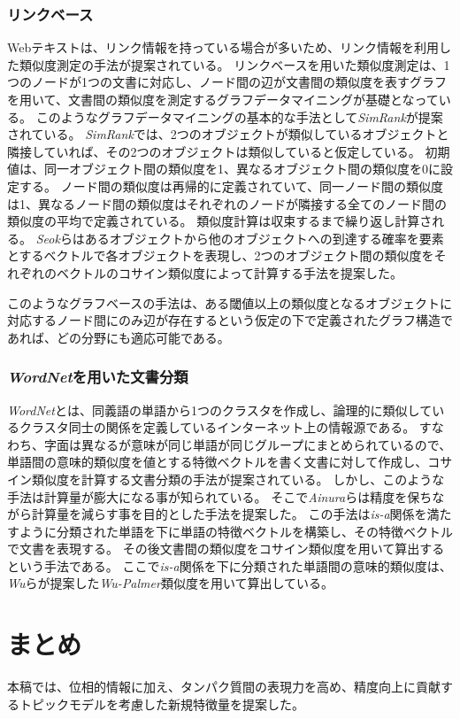 \documentclass[titlepage,12pt]{jreport}
\begin{document}
\subsection{リンクベース}
Webテキストは、リンク情報を持っている場合が多いため、リンク情報を利用した類似度測定の手法が提案されている。 リンクベースを用いた類似度測定は、1つのノードが1つの文書に対応し、ノード間の辺が文書間の類似度を表すグラフを用いて、文書間の類似度を測定するグラフデータマイニングが基礎となっている。 このようなグラフデータマイニングの基本的な手法として{\it SimRank}\cite{glen02}が提案されている。 {\it SimRank}では、2つのオブジェクトが類似しているオブジェクトと隣接していれば、その2つのオブジェクトは類似していると仮定している。 初期値は、同一オブジェクト間の類似度を1、異なるオブジェクト間の類似度を0に設定する。 ノード間の類似度は再帰的に定義されていて、同一ノード間の類似度は1、異なるノード間の類似度はそれぞれのノードが隣接する全てのノード間の類似度の平均で定義されている。 類似度計算は収束するまで繰り返し計算される。 {\it Seok}らはあるオブジェクトから他のオブジェクトへの到達する確率を要素とするベクトルで各オブジェクトを表現し、2つのオブジェクト間の類似度をそれぞれのベクトルのコサイン類似度によって計算する手法を提案した\cite{seok14}。

このようなグラフベースの手法は、ある閾値以上の類似度となるオブジェクトに対応するノード間にのみ辺が存在するという仮定の下で定義されたグラフ構造であれば、どの分野にも適応可能である。
\subsection{{\it WordNet}を用いた文書分類}
{\it WordNet}とは、同義語の単語から1つのクラスタを作成し、論理的に類似しているクラスタ同士の関係を定義しているインターネット上の情報源である。 すなわち、字面は異なるが意味が同じ単語が同じグループにまとめられているので、単語間の意味的類似度を値とする特徴ベクトルを書く文書に対して作成し、コサイン類似度を計算する文書分類の手法が提案されている\cite{Mostafa14}\cite{hongzhe13}\cite{shen07}。 しかし、このような手法は計算量が膨大になる事が知られている\cite{marchin14}。 そこで{\it Ainura}らは精度を保ちながら計算量を減らす事を目的とした手法を提案した\cite{ainura09}。 この手法は{\it is-a}関係\cite{wu94}を満たすように分類された単語を下に単語の特徴ベクトルを構築し、その特徴ベクトルで文書を表現する。 その後文書間の類似度をコサイン類似度を用いて算出するという手法である。 ここで{\it is-a}関係を下に分類された単語間の意味的類似度は、{\it Wu}らが提案した{\it Wu-Palmer}類似度を用いて算出している。

\chapter{まとめ\label{conclusion}}
本稿では、位相的情報に加え、タンパク質間の表現力を高め、精度向上に貢献するトピックモデルを考慮した新規特徴量を提案した。
\end{document}
